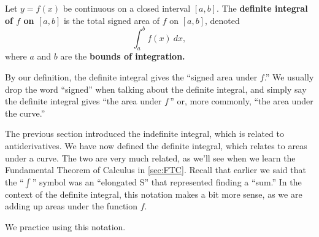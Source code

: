 {Let $y=f(x)$ be continuous on a closed interval $[a,b]$. The \textbf{definite integral of $f$ on $[a,b]$} is the total signed area of $f$ on $[a,b]$, denoted
\[\int_a^b f(x)\ dx,\]
where $a$ and $b$ are the \textbf{bounds of integration.}}

By our definition, the definite integral gives the ``signed area under $f$.'' We usually drop the word ``signed'' when talking about the definite integral, and simply say the definite integral gives ``the area under $f$\,'' or, more commonly, ``the area under the curve.''

The previous section introduced the indefinite integral, which is related to antiderivatives. We have now defined the definite integral, which relates to areas under a curve. The two are very much related, as we'll see when we learn the Fundamental Theorem of Calculus in \autoref{sec:FTC}. Recall that earlier we said that the ``$\int$'' symbol was an ``elongated S'' that represented finding a ``sum.'' In the context of the definite integral, this notation makes a bit more sense, as we are adding up areas under the function $f$.

We practice using this notation.

